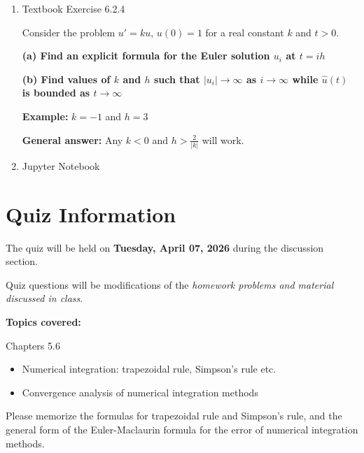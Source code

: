 \documentclass[reqno, answers]{exam}
\begin{document}
\begin{enumerate}
\begin{solution}
          Since $\tau_i \to 0$ as $h \to 0$, the method is consistent.
        \end{solution}


  \item Textbook Exercise 6.2.4
        \begin{solution}
          Consider the problem $u' = ku$, $u(0) = 1$ for a real constant $k$ and $t > 0$.

          \medskip

          \textbf{(a) Find an explicit formula for the Euler solution $u_i$ at $t = ih$}


          \medskip

          \textbf{(b) Find values of $k$ and $h$ such that $|u_i| \to \infty$ as $i \to \infty$ while $\hat{u}(t)$ is bounded as $t \to \infty$}

          \textbf{Example:} $\boxed{k = -1}$ and $\boxed{h = 3}$

          \textbf{General answer:} Any $k < 0$ and $h > \frac{2}{|k|}$ will work.
        \end{solution}

  \item Jupyter Notebook

\end{enumerate}

\section*{Quiz Information}

The quiz will be held on {\bf Tuesday, April 07, 2026} during the discussion section.

Quiz questions will be modifications of the {\it homework problems and material discussed in class}.

\textbf{Topics covered:}

Chapters 5.6

\begin{itemize}
  \item Numerical integration: trapezoidal rule, Simpson's rule etc.
  \item Convergence analysis of numerical integration methods
\end{itemize}

Please memorize the formulas for trapezoidal rule and Simpson's rule, and the general form of the Euler-Maclaurin formula for the error of numerical integration methods.
\end{document}
